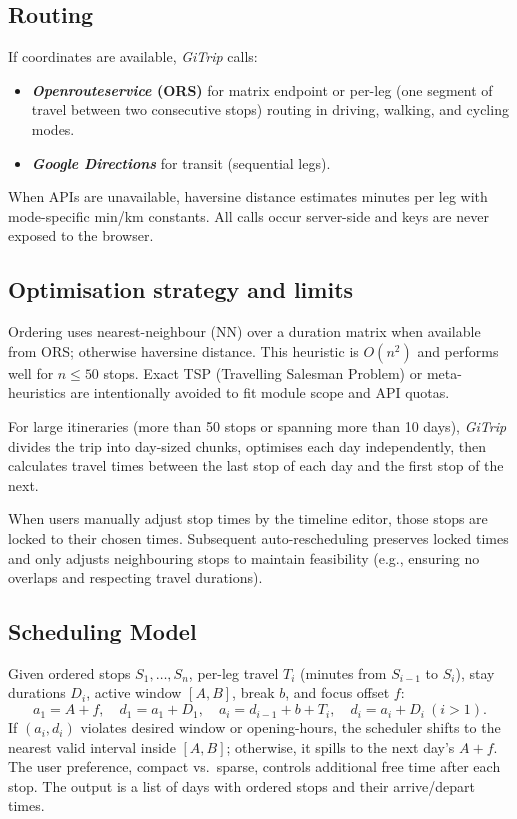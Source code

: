 \documentclass{article}
\begin{document}
\subsection{Routing}
If coordinates are available, \textit{GiTrip} calls:
\begin{itemize}
  \item \textbf{\textit{Openrouteservice} (ORS)} for matrix endpoint\cite{ors-matrix} or per-leg (one segment of travel between two consecutive stops) routing in driving, walking, and cycling modes.
  \item \textbf{\textit{Google Directions}} for transit (sequential legs).
\end{itemize}
When APIs are unavailable, haversine distance estimates minutes per leg with mode-specific min/km constants. All calls occur server-side and keys are never exposed to the browser.

\subsection{Optimisation strategy and limits}
Ordering uses nearest-neighbour (NN) over a duration matrix when available from ORS; otherwise haversine distance. This heuristic is $O(n^2)$ and performs well for $n\le 50$ stops\cite{hougardy-nn}. Exact TSP (Travelling Salesman Problem)\cite{applegate-tsp} or meta-heuristics\cite{johnson-mcgeoch} are intentionally avoided to fit module scope and API quotas.

For large itineraries (more than 50 stops or spanning more than 10 days), \textit{GiTrip} divides the trip into day-sized chunks, optimises each day independently, then calculates travel times between the last stop of each day and the first stop of the next.

When users manually adjust stop times by the timeline editor, those stops are locked to their chosen times. Subsequent auto-rescheduling preserves locked times and only adjusts neighbouring stops to maintain feasibility (e.g., ensuring no overlaps and respecting travel durations).

\subsection{Scheduling Model}
Given ordered stops $S_1,\dots,S_n$, per-leg travel $T_i$ (minutes from $S_{i-1}$ to $S_i$), stay durations $D_i$, active window $[A,B]$, break $b$, and focus offset $f$:
\[
a_1 = A+f,\quad d_1=a_1+D_1,\quad
a_i = d_{i-1}+b+T_i,\quad d_i=a_i+D_i \ (i>1).
\]
If $(a_i,d_i)$ violates desired window or opening-hours, the scheduler shifts to the nearest valid interval inside $[A,B]$; otherwise, it spills to the next day's $A+f$\cite{timetable-scheduling}. The user preference, compact vs.\ sparse, controls additional free time after each stop. The output is a list of days with ordered stops and their arrive/depart times.
\end{document}
